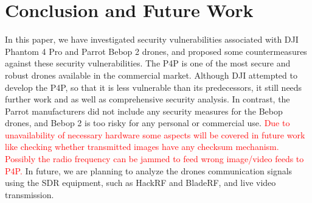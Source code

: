 \documentclass[conference]{IEEEtran}
\begin{document}
\section{Conclusion and Future Work }\label{sec:conclusion}

In this paper, we have investigated security  vulnerabilities associated with DJI Phantom 4 Pro and Parrot Bebop 2 drones, and proposed some countermeasures against these security  vulnerabilities. 
The P4P is one of the most secure and robust drones available in the commercial market. Although DJI attempted to develop the P4P, so that it is less vulnerable than its predecessors, it still needs further work and as well as comprehensive security analysis. In contrast, the Parrot manufacturers did not include any security measures for the Bebop drones, and Bebop 2 is too risky for any personal or commercial use. 
\textcolor{red}{Due to unavailability of necessary hardware some aspects will be covered in future work like checking whether transmitted images have any checksum mechanism. Possibly the radio frequency can be jammed to feed wrong image/video feeds to P4P.}
In future, we are planning to analyze the drones communication signals using the SDR equipment, such as  HackRF and BladeRF, and live video transmission. 








\end{document}
